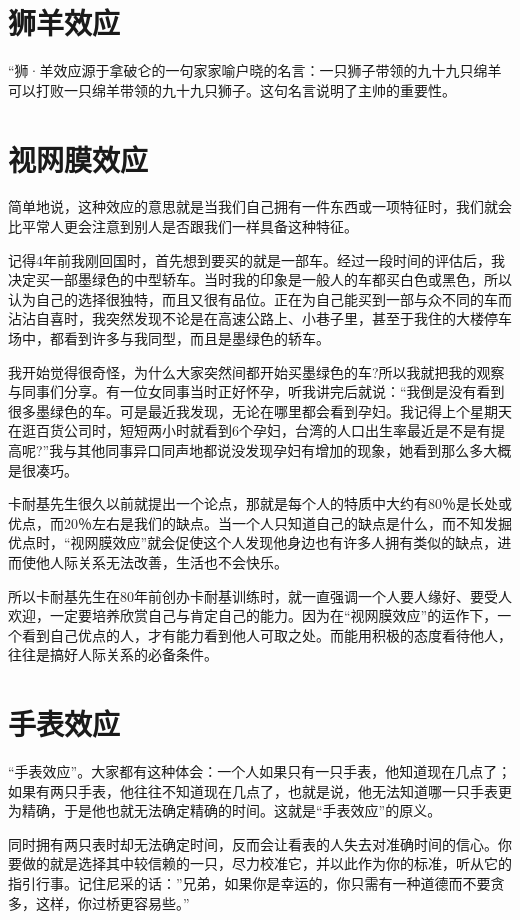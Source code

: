 \documentclass[11pt]{ctexart}
\begin{document}
\section{狮羊效应}
\label{sec-87}


“狮·羊效应源于拿破仑的一句家家喻户晓的名言：一只狮子带领的九十九只绵羊可以打败一只绵羊带领的九十九只狮子。这句名言说明了主帅的重要性。
\section{视网膜效应}
\label{sec-88}


简单地说，这种效应的意思就是当我们自己拥有一件东西或一项特征时，我们就会比平常人更会注意到别人是否跟我们一样具备这种特征。

记得4年前我刚回国时，首先想到要买的就是一部车。经过一段时间的评估后，我决定买一部墨绿色的中型轿车。当时我的印象是一般人的车都买白色或黑色，所以认为自己的选择很独特，而且又很有品位。正在为自己能买到一部与众不同的车而沾沾自喜时，我突然发现不论是在高速公路上、小巷子里，甚至于我住的大楼停车场中，都看到许多与我同型，而且是墨绿色的轿车。

我开始觉得很奇怪，为什么大家突然间都开始买墨绿色的车?所以我就把我的观察与同事们分享。有一位女同事当时正好怀孕，听我讲完后就说：“我倒是没有看到很多墨绿色的车。可是最近我发现，无论在哪里都会看到孕妇。我记得上个星期天在逛百货公司时，短短两小时就看到6个孕妇，台湾的人口出生率最近是不是有提高呢?”我与其他同事异口同声地都说没发现孕妇有增加的现象，她看到那么多大概是很凑巧。

卡耐基先生很久以前就提出一个论点，那就是每个人的特质中大约有80％是长处或优点，而20％左右是我们的缺点。当一个人只知道自己的缺点是什么，而不知发掘优点时，“视网膜效应”就会促使这个人发现他身边也有许多人拥有类似的缺点，进而使他人际关系无法改善，生活也不会快乐。

所以卡耐基先生在80年前创办卡耐基训练时，就一直强调一个人要人缘好、要受人欢迎，一定要培养欣赏自己与肯定自己的能力。因为在“视网膜效应”的运作下，一个看到自己优点的人，才有能力看到他人可取之处。而能用积极的态度看待他人，往往是搞好人际关系的必备条件。
\section{手表效应}
\label{sec-89}


“手表效应”。大家都有这种体会：一个人如果只有一只手表，他知道现在几点了；如果有两只手表，他往往不知道现在几点了，也就是说，他无法知道哪一只手表更为精确，于是他也就无法确定精确的时间。这就是“手表效应”的原义。

同时拥有两只表时却无法确定时间，反而会让看表的人失去对准确时间的信心。你要做的就是选择其中较信赖的一只，尽力校准它，并以此作为你的标准，听从它的指引行事。记住尼采的话：''兄弟，如果你是幸运的，你只需有一种道德而不要贪多，这样，你过桥更容易些。''
\end{document}
